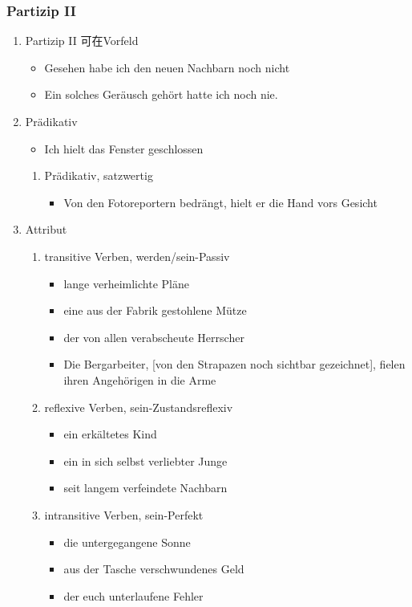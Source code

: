 \documentclass[UTF8]{report}
\begin{document}
\subsubsection{Partizip II}
\begin{enumerate}
    \item Partizip II 可在Vorfeld
    \begin{itemize}
        \item Gesehen habe ich den neuen Nachbarn noch nicht
        \item Ein solches Geräusch gehört hatte ich noch nie.
    \end{itemize}
    \item Prädikativ
    \begin{itemize}
        \item Ich hielt das Fenster geschlossen
    \end{itemize}
    \begin{enumerate}
        \item Prädikativ, satzwertig
        \begin{itemize}
            \item Von den Fotoreportern bedrängt, hielt er die Hand vors Gesicht
        \end{itemize}
    \end{enumerate}
    \item Attribut
    \begin{enumerate}
        \item transitive Verben, werden/sein-Passiv
        \begin{itemize}
            \item lange verheimlichte Pläne
            \item eine aus der Fabrik gestohlene Mütze
            \item der von allen verabscheute Herrscher
            \item Die Bergarbeiter, [von den Strapazen noch sichtbar gezeichnet], fielen ihren Angehörigen in die Arme
        \end{itemize}
        \item reflexive Verben, sein-Zustandsreflexiv
        \begin{itemize}
            \item ein erkältetes Kind
            \item ein in sich selbst verliebter Junge
            \item seit langem verfeindete Nachbarn
        \end{itemize}
        \item intransitive Verben, sein-Perfekt
        \begin{itemize}
            \item die untergegangene Sonne
            \item aus der Tasche verschwundenes Geld
            \item der euch unterlaufene Fehler
        \end{itemize}
    \end{enumerate}
\end{enumerate}
\end{document}
